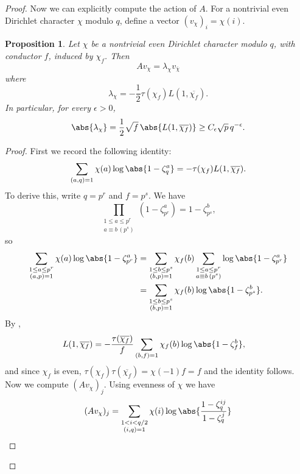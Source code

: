 \documentclass{article}
\newtheorem{prop}{Proposition}
\begin{document}
\begin{proof}
Now we can explicitly compute the action of $A$. For a nontrivial even Dirichlet character $\chi$ modulo $q$, define a vector $(v_\chi)_i = \chi(i)$.
\begin{prop}
    Let $\chi$ be a nontrivial even Dirichlet character modulo $q$, with conductor $f$, induced by $\chi_f$. Then
    \[
    A v_\chi = \lambda_\chi v_{\overline{\chi}}
    \]
    where
    \[
    \lambda_\chi
    =
    -\frac{1}{2}\tau(\chi_f)L(1,\overline{\chi_f}).
    \]
    In particular, for every $\epsilon > 0$,
    \[
    \abs{\lambda_\chi}
    =
    \frac{1}{2}\sqrt{f}\,\abs{L(1,\overline{\chi_f})}
    \geq C_\epsilon \sqrt{p}\, q^{-\epsilon}.
    \]
\end{prop}
\begin{proof}
First we record the following identity:
    \begin{align*}
    \sum_{(a,q) = 1} \chi(a) \log\abs{1-\zeta_q^a}
    =
    -\tau(\chi_f)
    L(1,\overline{\chi_f}).
    \end{align*}
    To derive this, write $q=p^r$ and $f=p^s$. We have
    \[
    \prod_{\substack{1 \leq a \leq p^r \\ a \equiv b \, (p^s)}} (1-\zeta_{p^r}^a)=1-\zeta_{p^s}^b,
    \]
    so
    \begin{align*}
    \sum_{\substack{1 \leq a \leq p^r \\ (a,p)=1}}\chi(a)\log\abs{1-\zeta_{p^r}^a}
    &=
    \sum_{\substack{1 \leq b \leq p^s \\ (b,p)=1}}
    \chi_f(b)
    \sum_{\substack{1 \leq a \leq p^r \\ a \equiv b \, (p^s)}}
    \log\abs{1-\zeta_{p^r}^a}
    \\
    &=
    \sum_{\substack{1 \leq b \leq p^s \\ (b,p)=1}}
    \chi_f(b)\log\abs{1-\zeta_{p^s}^b}.
    \end{align*}
    By \cite[Theorem 4.9]{Washington1997},
    \begin{align*}
    L(1,\overline{\chi_f})
    &=
    -\frac{\tau(\overline{\chi_f})}{f}
    \sum_{(b,f)=1}\chi_f(b)\log\abs{1-\zeta_f^b},
    \end{align*}
    and since $\chi_f$ is even, $\tau(\chi_f)\tau(\overline{\chi_f}) = \chi(-1)f = f$ and the identity follows.
Now we compute $(A v_\chi)_j$. Using evenness of $\chi$ we have
\begin{align*}
(A v_\chi)_j
&=
\sum_{\substack{1 < i < q/2 \\ (i,q) = 1}}
\chi(i)
\log \abs{\frac{1-\zeta_q^{ij}}{1-\zeta_q^j}}
\\

\end{align*}
\end{proof}
\end{proof}
\end{document}
